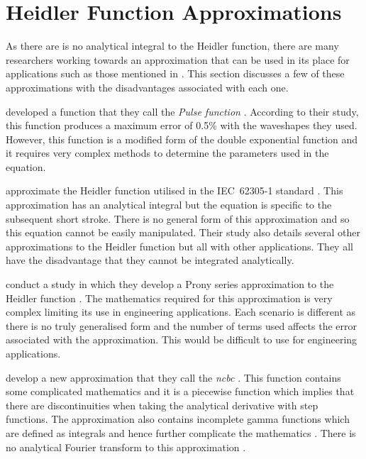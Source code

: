 
\section{Heidler Function Approximations}
\label{sec:background_approximations}
As there are is no analytical integral to the Heidler function, there are many researchers working towards an approximation that can be used in its place for applications such as those mentioned in . This section discusses a few of these approximations with the disadvantages associated with each one.

\citeauthor{ZhangFeizhouandLiuShanghe2002} developed a function that they call the \textit{Pulse function} \cite{ZhangFeizhouandLiuShanghe2002}. According to their study, this function produces a maximum error of 0.5\% with the waveshapes they used. However, this function is a modified form of the double exponential function and it requires very complex methods to determine the parameters used in the equation.

\citeauthor{Heidler2002} approximate the Heidler function utilised in the IEC~62305-1 standard \cite{Heidler2002}. This approximation has an analytical integral but the equation is specific to the subsequent short stroke. There is no general form of this approximation and so this equation cannot be easily manipulated. Their study also details several other approximations to the Heidler function but all with other applications. They all have the disadvantage that they cannot be integrated analytically.

\citeauthor{Delfino2012} conduct a study in which they develop a Prony series approximation to the Heidler function \cite{Delfino2012}. The mathematics required for this approximation is very complex limiting its use in engineering applications. Each scenario is different as there is no truly generalised form and the number of terms used affects the error associated with the approximation. This would be difficult to use for engineering applications.

\citeauthor{Javor2011} develop a new approximation that they call the \textit{\gls{ncbc}} \cite{Javor2011,Javor2012}. This function contains some complicated mathematics and it is a piecewise function which implies that there are discontinuities when taking the analytical derivative with step functions. The approximation also contains incomplete gamma functions which are defined as integrals and hence further complicate the mathematics \cite{Gautschi:1979:CPI}. There is no analytical Fourier transform to this approximation \cite{Javor}.

